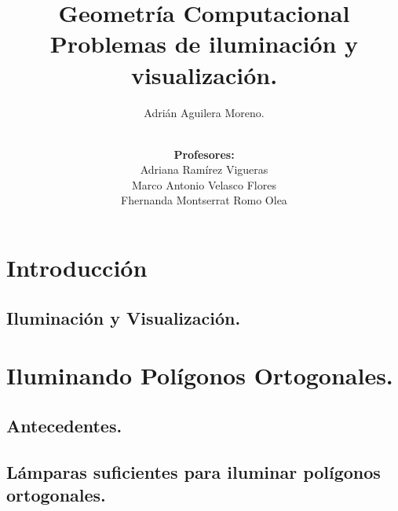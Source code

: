 \documentclass{beamer}
\title{\Large {Geometría Computacional}\\ {\color{mostazaccm} \textbf{Problemas de iluminación y visualización.}}}
\author{Adrián Aguilera Moreno.}
\date{\\\textbf{Profesores:}
  \\ {Adriana Ramírez Vigueras}
  \\ {Marco Antonio Velasco Flores}
  \\ {Fhernanda Montserrat Romo Olea}}
\institute{aguilera@ciencias.unam.mx}
\begin{document}
{

\begin{frame}
  \titlepage %
\end{frame}

} %

\begin{frame}
\tableofcontents %
\end{frame}

\section{Introducción} %
\subsection{Iluminación y Visualización.}



\section{Iluminando Polígonos Ortogonales.}
\subsection{Antecedentes.}

\subsection{Lámparas suficientes para iluminar polígonos ortogonales.}

\end{document}
